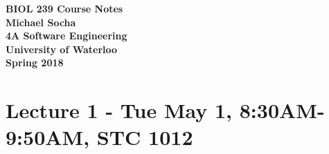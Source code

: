 \documentclass[12pt,titlepage]{article}
\begin{document}
  \begin{titlepage}
    \vspace*{\fill}
    \centering

    \textbf{\Huge BIOL 239 Course Notes} \\ [1em]
    \textbf{\Large Michael Socha} \\ [1em]
    \textbf{\large 4A Software Engineering} \\
    \textbf{\large University of Waterloo} \\
    \textbf{\large Spring 2018} \\
    \vspace*{\fill}
  \end{titlepage}

  \newpage 

  \section*{Lecture 1 - Tue May 1, 8:30AM-9:50AM, STC 1012}
\end{document}
